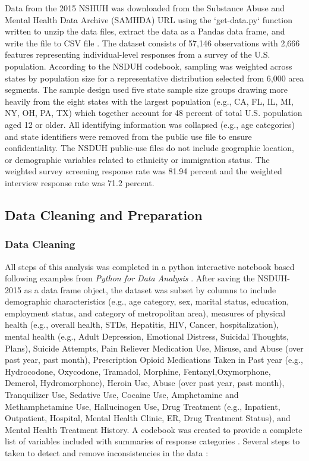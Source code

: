 \documentclass[sigconf]{acmart}
\begin{document}
Data from the 2015 NSHUH was downloaded from the Substance Abuse and Mental 
Health Data Archive (SAMHDA) \cite{samhsa16} URL using the `get-data.py` 
function written to unzip the data files, extract the data as a Pandas data 
frame, and write the file to CSV file \cite{getdata17}. The dataset consists 
of 57,146 observations with 2,666 features representing individual-level 
responses from a survey of the U.S. population. According to the NSDUH 
codebook, sampling was weighted across states by population size for a 
representative distribution selected from 6,000 area segments. The sample 
design used five state sample size groups drawing more heavily from the eight 
states with the largest population (e.g., CA, FL, IL, MI, NY, OH, PA, TX) which 
together account for 48 percent of total U.S. population aged 12 or older. 
All identifying information was collapsed (e.g., age categories) and state 
identifiers were removed from the public use file to ensure confidentiality. 
The NSDUH public-use files do not include geographic location, or demographic 
variables related to ethnicity or immigration status. The weighted survey 
screening response rate was 81.94 percent and the weighted interview response 
rate was 71.2 percent. 

\subsection{Data Cleaning and Preparation }

\subsubsection{Data Cleaning}
All steps of this analysis was completed in a python interactive notebook 
\cite{data17} based following examples from \emph{Python for Data Analysis}
\cite{mckinney17}. After saving the NSDUH-2015 as a data frame object, the 
dataset was subset by columns to include demographic characteristics (e.g., 
age category, sex, marital status, education, employment status, and category 
of metropolitan area), measures of physical health (e.g., overall health, 
STDs, Hepatitis, HIV, Cancer, hospitalization), mental health (e.g., Adult 
Depression, Emotional Distress, Suicidal Thoughts, Plans), Suicide Attempts, 
Pain Reliever Medication Use, Misuse, and Abuse (over past year, past month), 
Prescription Opioid Medications Taken in Past year (e.g., Hydrocodone, 
Oxycodone, Tramadol, Morphine, Fentanyl,Oxymorphone, Demerol, Hydromorphone), 
Heroin Use, Abuse (over past year, past month), Tranquilizer Use, Sedative Use, 
Cocaine Use, Amphetamine and Methamphetamine Use, Hallucinogen Use, Drug 
Treatment (e.g., Inpatient, Outpatient, Hospital, Mental Health Clinic, ER, 
Drug Treatment Status), and Mental Health Treatment History. A codebook was 
created to provide a complete list of variables included with summaries 
of response categories \cite{codebook17}. Several steps to taken to detect 
and remove inconsistencies in the data \cite{rahm00}: 
\end{document}

